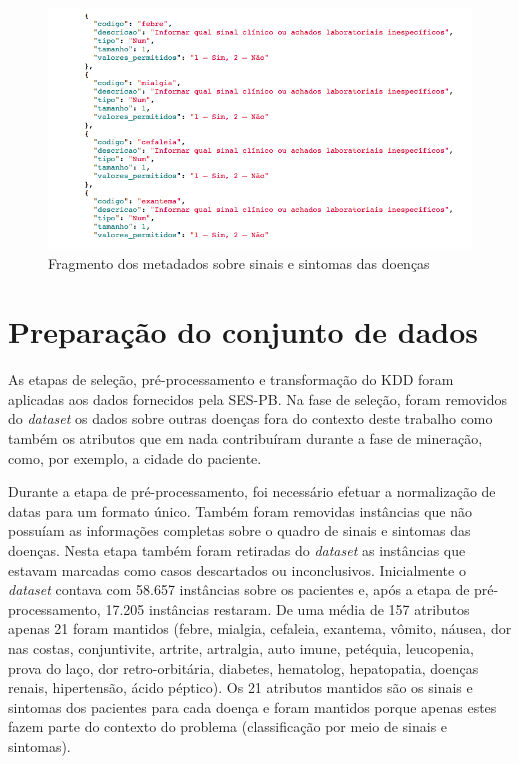 \begin{figure}[htb]
  \caption{\label{fig:metadados}Fragmento dos metadados sobre sinais e sintomas das doenças}
  \begin{center}
    \includegraphics[width=\textwidth]{imagens/fragmentodosmetadados.png}
  \end{center}
\end{figure}
\newpage

\section{Preparação do conjunto de dados}

As etapas de seleção, pré-processamento e transformação do KDD foram aplicadas aos dados fornecidos pela SES-PB. Na fase de seleção, foram removidos do \textit{dataset} os dados sobre outras doenças fora do contexto deste trabalho como também os atributos que em nada contribuíram durante a fase de mineração, como, por exemplo, a cidade do paciente.

Durante a etapa de pré-processamento, foi necessário efetuar a normalização de datas para um formato único. Também foram removidas instâncias que não possuíam as informações completas sobre o quadro de sinais e sintomas das doenças. Nesta etapa também foram retiradas do \textit{dataset} as instâncias que estavam marcadas como casos descartados ou inconclusivos. Inicialmente o \textit{dataset} contava com 58.657 instâncias sobre os pacientes e, após a etapa de pré-processamento, 17.205 instâncias restaram. De uma média de 157 atributos apenas 21 foram mantidos (febre, mialgia, cefaleia, exantema, vômito, náusea, dor nas costas, conjuntivite, artrite, artralgia, auto imune, petéquia, leucopenia, prova do laço, dor retro-orbitária, diabetes, hematolog, hepatopatia, doenças renais, hipertensão, ácido péptico). Os 21 atributos mantidos são os sinais e sintomas dos pacientes para cada doença e foram mantidos porque apenas estes fazem parte do contexto do problema (classificação por meio de sinais e sintomas).

